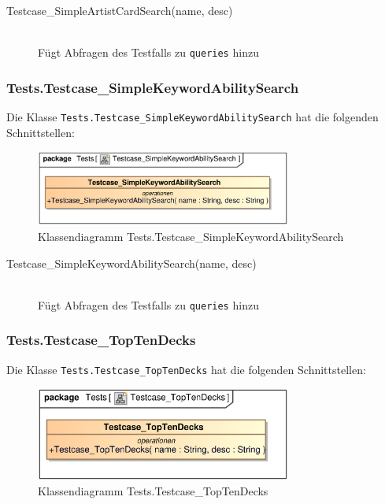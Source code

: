 \begin{description}
    \item[Testcase\_SimpleArtistCardSearch(name, desc)] \hfill \\
    Fügt Abfragen des Testfalls zu \verb|queries| hinzu
\end{description}

\subsubsection{Tests.Testcase\_SimpleKeywordAbilitySearch}
Die Klasse \verb|Tests.Testcase_SimpleKeywordAbilitySearch| hat die folgenden Schnittstellen:

\begin{figure}[H]
    \myfloatalign
    \includegraphics[width=0.75\textwidth]{gfx/MtGDeepAnalysis/Testcase_SimpleKeywordAbilitySearch.eps}
    \caption{Klassendiagramm Tests.Testcase\_SimpleKeywordAbilitySearch}
    \label{fig:class:tests.Testcase_SimpleKeywordAbilitySearch}
\end{figure}

\begin{description}
    \item[Testcase\_SimpleKeywordAbilitySearch(name, desc)] \hfill \\
    Fügt Abfragen des Testfalls zu \verb|queries| hinzu
\end{description}

\subsubsection{Tests.Testcase\_TopTenDecks}
Die Klasse \verb|Tests.Testcase_TopTenDecks| hat die folgenden Schnittstellen:

\begin{figure}[H]
    \myfloatalign
    \includegraphics[width=0.75\textwidth]{gfx/MtGDeepAnalysis/Testcase_TopTenDecks.eps}
    \caption{Klassendiagramm Tests.Testcase\_TopTenDecks}
    \label{fig:class:tests.Testcase_TopTenDecks}
\end{figure}

